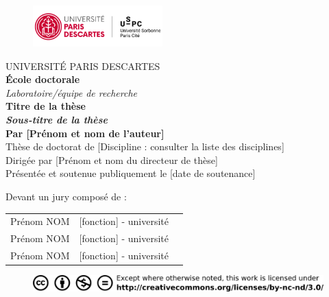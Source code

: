 \documentclass[12pt,]{book}
\title{}
\author{}
\date{}
\theoremstyle{definition}
\theoremstyle{definition}
\theoremstyle{definition}
\theoremstyle{remark}
\begin{document}
\begin{titlepage}
\frontmatter
\begin{figure}[t]
\includegraphics[width=5cm]{figures-ext/LogoParisDescartes}
\end{figure}

\begin{center}
UNIVERSITÉ PARIS DESCARTES \\
\vspace*{1cm}
\textbf{École doctorale}\\
\vspace*{0,5cm}
\textit{Laboratoire/équipe de recherche}\\
\vspace*{1cm}
\LARGE{\textbf{Titre de la thèse}}\\
\vspace*{0,5cm}
\large{\textit{\textbf{Sous-titre de la thèse}}}\\
\vspace*{2cm}
\large{\textbf{Par [Prénom et nom de l'auteur]}}\\
\vspace*{1cm}
Thèse de doctorat de [Discipline : consulter la liste des disciplines]\\
\vspace*{1cm}
Dirigée par [Prénom et nom du directeur de thèse]\\
\vspace*{1cm}
\small{Présentée et soutenue publiquement le [date de soutenance]}\\
\end{center}
\vspace*{1cm}
\begin{footnotesize}
Devant un jury composé de : \\
\begin{tabular}{lll}
Prénom NOM & [fonction] - université\\
Prénom NOM & [fonction] - université\\
Prénom NOM & [fonction] - université\\
\end{tabular}
\end{footnotesize}

\begin{figure}[b]
\begin{center}
\includegraphics{figures-ext/creativecommons}
\end{center}
\end{figure}





\end{titlepage}
\end{document}
